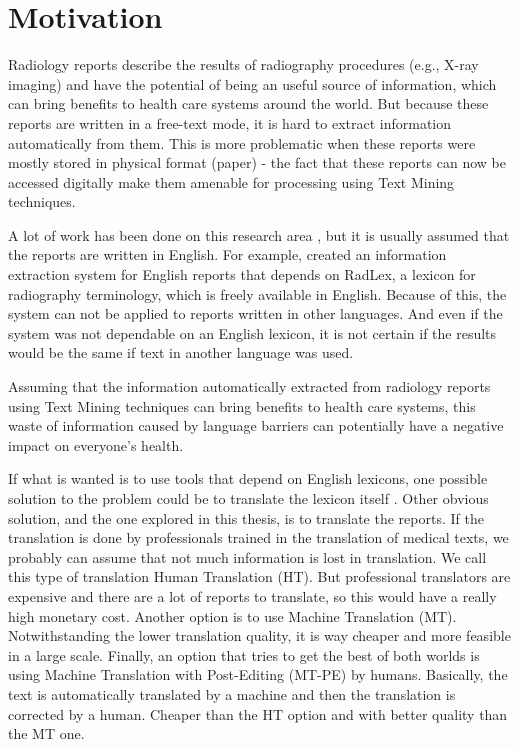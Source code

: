 \label{chap1}

\section{Motivation}
\label{motivation}

Radiology reports describe the results of radiography procedures (e.g., X-ray imaging) and have the potential of being an useful source of information, which can bring benefits to health care systems around the world. But because these reports are written in a free-text mode, it is hard to extract information automatically from them. This is more problematic when these reports were mostly stored in physical format (paper) - the fact that these reports can now be accessed digitally make them amenable for processing using Text Mining techniques. 

A lot of work has been done on this research area \citep{Pons2016}, but it is usually assumed that the reports are written in English. For example, \citep{Hassanpour2016} created an information extraction system for English reports that depends on RadLex, a lexicon for radiography terminology, which is freely available in English. Because of this, the system can not be applied to reports written in other languages. And even if the system was not dependable on an English lexicon, it is not certain if the results would be the same if text in another language was used.

Assuming that the information automatically extracted from radiology reports using Text Mining techniques can bring benefits to health care systems, this waste of information caused by language barriers can potentially have a negative impact on everyone's health.

If what is wanted is to use tools that depend on English lexicons, one possible solution to the problem could be to translate the lexicon itself \citep{Bretschneider}. Other obvious solution, and the one explored in this thesis, is to translate the reports. If the translation is done by professionals trained in the translation of medical texts, we probably can assume that not much information is lost in translation. We call this type of translation Human Translation (HT). But professional translators are expensive and there are a lot of reports to translate, so this would have a really high monetary cost. Another option is to use Machine Translation (MT). Notwithstanding the lower translation quality, it is way cheaper and more feasible in a large scale. Finally, an option that tries to get the best of both worlds is using Machine Translation with Post-Editing (MT-PE) by humans. Basically, the text is automatically translated by a machine and then the translation is corrected by a human. Cheaper than the HT option and with better quality than the MT one. 

